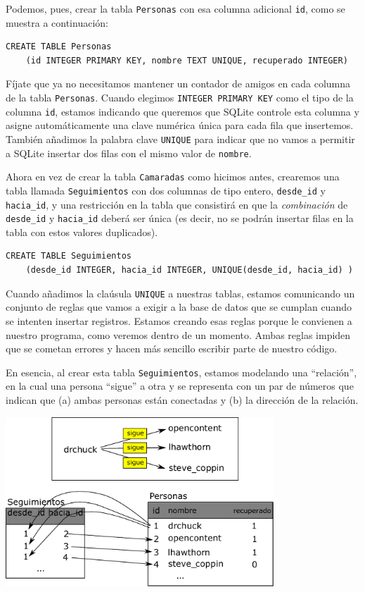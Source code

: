 Podemos, pues, crear la tabla {\tt Personas} con esa columna adicional
{\tt id}, como se muestra a continuación:

\beforeverb
\begin{verbatim}
CREATE TABLE Personas
    (id INTEGER PRIMARY KEY, nombre TEXT UNIQUE, recuperado INTEGER)
\end{verbatim}
\afterverb
%
Fíjate que ya no necesitamos mantener un contador de amigos en cada columna
de la tabla {\tt Personas}.
Cuando elegimos {\tt INTEGER PRIMARY KEY} como el tipo de la columna {\tt id},
estamos indicando que queremos que SQLite controle esta columna y
asigne automáticamente una clave numérica única para cada fila que insertemos.
También añadimos la palabra clave {\tt UNIQUE} para indicar que no vamos
a permitir a SQLite insertar dos filas con el mismo valor de {\tt nombre}.

Ahora en vez de crear la tabla {\tt Camaradas} como hicimos antes, crearemos
una tabla llamada {\tt Seguimientos} con dos columnas de tipo entero,
\verb"desde_id" y \verb"hacia_id", y una restricción en la tabla que consistirá en que
la \emph{combinación} de \verb"desde_id" y \verb"hacia_id" deberá ser única
(es decir, no se podrán insertar filas en la tabla con estos valores duplicados).

\beforeverb
\begin{verbatim}
CREATE TABLE Seguimientos 
    (desde_id INTEGER, hacia_id INTEGER, UNIQUE(desde_id, hacia_id) )
\end{verbatim}
\afterverb
%
Cuando añadimos la claúsula {\tt UNIQUE} a nuestras tablas, estamos comunicando un conjunto
de reglas que vamos a exigir a la base de datos que se cumplan cuando se intenten insertar
registros. Estamos creando esas reglas porque le convienen a nuestro programa, como
veremos dentro de un momento. Ambas reglas impiden que se cometan errores y hacen
más sencillo escribir parte de nuestro código.

En esencia, al crear esta tabla {\tt Seguimientos}, estamos modelando una
``relación'', en la cual una persona ``sigue'' a otra
y se representa con un par de números que indican que (a) ambas personas están
conectadas y (b) la dirección de la relación.

\beforefig
\centerline{\includegraphics[height=2.50in]{figs2/twitter.eps}}
\afterfig


